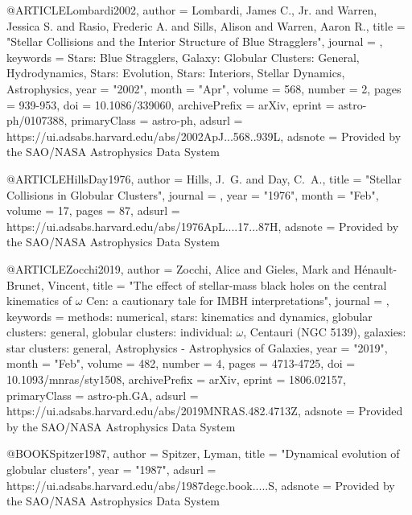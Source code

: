 \documentclass[twocolumn,tighten]{aastex63}
\begin{document}
@ARTICLE{Lombardi2002,
       author = {{Lombardi}, James C., Jr. and {Warren}, Jessica S. and
         {Rasio}, Frederic A. and {Sills}, Alison and {Warren}, Aaron R.},
        title = "{Stellar Collisions and the Interior Structure of Blue Stragglers}",
      journal = {\apj},
     keywords = {Stars: Blue Stragglers, Galaxy: Globular Clusters: General, Hydrodynamics, Stars: Evolution, Stars: Interiors, Stellar Dynamics, Astrophysics},
         year = "2002",
        month = "Apr",
       volume = {568},
       number = {2},
        pages = {939-953},
          doi = {10.1086/339060},
archivePrefix = {arXiv},
       eprint = {astro-ph/0107388},
 primaryClass = {astro-ph},
       adsurl = {https://ui.adsabs.harvard.edu/abs/2002ApJ...568..939L},
      adsnote = {Provided by the SAO/NASA Astrophysics Data System}
}

@ARTICLE{HillsDay1976,
       author = {{Hills}, J.~G. and {Day}, C.~A.},
        title = "{Stellar Collisions in Globular Clusters}",
      journal = {\aplett},
         year = "1976",
        month = "Feb",
       volume = {17},
        pages = {87},
       adsurl = {https://ui.adsabs.harvard.edu/abs/1976ApL....17...87H},
      adsnote = {Provided by the SAO/NASA Astrophysics Data System}
}

@ARTICLE{Zocchi2019,
       author = {{Zocchi}, Alice and {Gieles}, Mark and {H{\'e}nault-Brunet}, Vincent},
        title = "{The effect of stellar-mass black holes on the central kinematics of {\ensuremath{\omega}} Cen: a cautionary tale for IMBH interpretations}",
      journal = {\mnras},
     keywords = {methods: numerical, stars: kinematics and dynamics, globular clusters: general, globular clusters: individual: {\ensuremath{\omega}}, Centauri (NGC 5139), galaxies: star clusters: general, Astrophysics - Astrophysics of Galaxies},
         year = "2019",
        month = "Feb",
       volume = {482},
       number = {4},
        pages = {4713-4725},
          doi = {10.1093/mnras/sty1508},
archivePrefix = {arXiv},
       eprint = {1806.02157},
 primaryClass = {astro-ph.GA},
       adsurl = {https://ui.adsabs.harvard.edu/abs/2019MNRAS.482.4713Z},
      adsnote = {Provided by the SAO/NASA Astrophysics Data System}
}

@BOOK{Spitzer1987,
       author = {{Spitzer}, Lyman},
        title = "{Dynamical evolution of globular clusters}",
         year = "1987",
       adsurl = {https://ui.adsabs.harvard.edu/abs/1987degc.book.....S},
      adsnote = {Provided by the SAO/NASA Astrophysics Data System}
}
\end{document}
